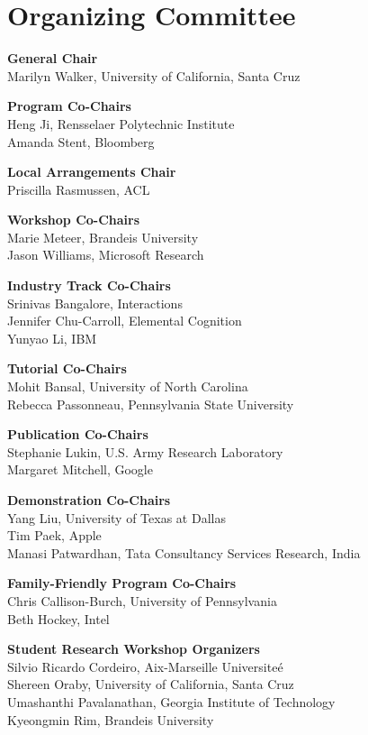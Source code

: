 \markboth{}{} %
\markright{}{} %

\section{Organizing Committee}{}%

\setlength{\parindent}{0pt}

{\bf General Chair} \\
Marilyn Walker, University of California, Santa Cruz

{\bf Program Co-Chairs} \\
Heng Ji, Rensselaer Polytechnic Institute\\
Amanda Stent, Bloomberg

{\bf Local Arrangements Chair} \\
Priscilla Rasmussen, ACL

{\bf Workshop Co-Chairs} \\
Marie Meteer, Brandeis University\\
Jason Williams, Microsoft Research

{\bf Industry Track Co-Chairs} \\
Srinivas Bangalore, Interactions \\
Jennifer Chu-Carroll, Elemental Cognition \\
Yunyao Li, IBM

{\bf Tutorial Co-Chairs} \\
Mohit Bansal, University of North Carolina\\
Rebecca Passonneau, Pennsylvania State University

{\bf Publication Co-Chairs} \\
Stephanie Lukin, U.S. Army Research Laboratory\\
Margaret Mitchell, Google

{\bf Demonstration Co-Chairs} \\
Yang Liu, University of Texas at Dallas\\
Tim Paek, Apple\\
Manasi Patwardhan, Tata Consultancy Services Research, India

{\bf Family-Friendly Program Co-Chairs} \\
Chris Callison-Burch, University of Pennsylvania\\
Beth Hockey, Intel

{\bf Student Research Workshop Organizers} \\
Silvio Ricardo Cordeiro, Aix-Marseille Universite\'{e}\\
Shereen Oraby, University of California, Santa Cruz \\
Umashanthi Pavalanathan, Georgia Institute of Technology\\
Kyeongmin Rim, Brandeis University

